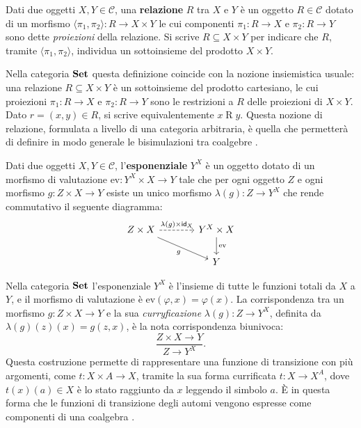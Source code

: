 \begin{definition}[Relazione]

  Dati due oggetti \(X, Y \in \mathcal{C}\), una \textbf{relazione} \(R\) tra \(X\) e \(Y\) è un oggetto \(R \in \mathcal{C}\) dotato di un morfismo \(\langle \pi_1, \pi_2 \rangle : R \to X \times Y\) le cui componenti \(\pi_1 : R \to X\) e \(\pi_2 : R \to Y\) sono dette \textit{proiezioni} della relazione. Si scrive \(R \subseteq X \times Y\) per indicare che \(R\), tramite \(\langle \pi_1, \pi_2 \rangle\), individua un sottoinsieme del prodotto \(X \times Y\).

\end{definition}



Nella categoria \(\operatorname{\mathbf{Set}}\) questa definizione coincide con la nozione insiemistica usuale: una relazione \(R \subseteq X \times Y\) è un sottoinsieme del prodotto cartesiano, le cui proiezioni \(\pi_1 : R \to X\) e \(\pi_2 : R \to Y\) sono le restrizioni a \(R\) delle proiezioni di \(X \times Y\). Dato \(r = (x, y) \in R\), si scrive equivalentemente \(x \mathrel{R} y\). Questa nozione di relazione, formulata a livello di una categoria arbitraria, è quella che permetterà di definire in modo generale le bisimulazioni tra coalgebre \cite{jacobs2017,rutten2000}.

\begin{definition}[Esponenziale]
  Dati due oggetti \(X, Y \in \mathcal{C}\), l'\textbf{esponenziale} \(Y^X\) è un oggetto dotato di un morfismo di valutazione \(\mathrm{ev} : Y^X \times X \to Y\) tale che per ogni oggetto \(Z\) e ogni morfismo \(g : Z \times X \to Y\) esiste un unico morfismo \(\lambda(g) : Z \to Y^X\) che rende commutativo il seguente diagramma:
  \[
    \begin{tikzcd}[column sep=large]
      Z \times X \arrow[dr, "g"'] \arrow[r, dashed, "\lambda(g) \times \id_X"] & Y^X \times X \arrow[d, "\mathrm{ev}"] \\
      & Y
    \end{tikzcd}
  \]
\end{definition}

Nella categoria \(\operatorname{\mathbf{Set}}\) l'esponenziale \(Y^X\) è l'insieme di tutte le funzioni totali da \(X\) a \(Y\), e il morfismo di valutazione è \(\mathrm{ev}(\varphi, x) = \varphi(x)\). La corrispondenza tra un morfismo \(g : Z \times X \to Y\) e la sua \textit{curryficazione} \(\lambda(g) : Z \to Y^X\), definita da \(\lambda(g)(z)(x) = g(z, x)\), è la nota corrispondenza biunivoca:
\[
  \frac{Z \times X \to Y}{Z \to Y^X}.
\]
Questa costruzione permette di rappresentare una funzione di transizione con più argomenti, come \(t : X \times A \to X\), tramite la sua forma currificata \(t : X \to X^A\), dove \(t(x)(a) \in X\) è lo stato raggiunto da \(x\) leggendo il simbolo \(a\). È in questa forma che le funzioni di transizione degli automi vengono espresse come componenti di una coalgebra \cite{jacobs2017}.